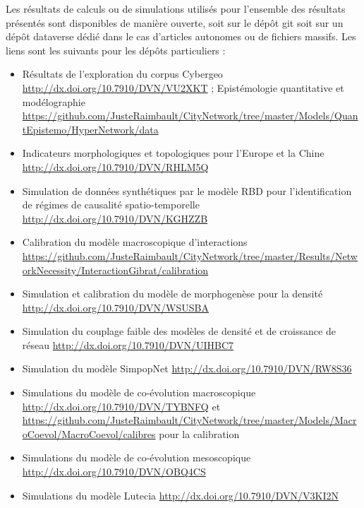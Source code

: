 Les résultats de calculs ou de simulations utilisés pour l'ensemble des résultats présentés sont disponibles de manière ouverte, soit sur le dépôt git soit sur un dépôt dataverse dédié dans le cas d'articles autonomes ou de fichiers massifs. Les liens sont les suivants pour les dépôts particuliers :

\begin{itemize}
	\item Résultats de l'exploration du corpus Cybergeo \url{http://dx.doi.org/10.7910/DVN/VU2XKT} ; Epistémologie quantitative et modélographie \url{https://github.com/JusteRaimbault/CityNetwork/tree/master/Models/QuantEpistemo/HyperNetwork/data}
	\item Indicateurs morphologiques et topologiques pour l'Europe et la Chine \url{http://dx.doi.org/10.7910/DVN/RHLM5Q}
	\item Simulation de données synthétiques par le modèle RBD pour l'identification de régimes de causalité spatio-temporelle \url{http://dx.doi.org/10.7910/DVN/KGHZZB}
	\item Calibration du modèle macroscopique d'interactions \url{https://github.com/JusteRaimbault/CityNetwork/tree/master/Results/NetworkNecessity/InteractionGibrat/calibration}
	\item Simulation et calibration du modèle de morphogenèse pour la densité \url{http://dx.doi.org/10.7910/DVN/WSUSBA}
	\item Simulation du couplage faible des modèles de densité et de croissance de réseau \url{http://dx.doi.org/10.7910/DVN/UIHBC7}
	\item Simulation du modèle SimpopNet \url{http://dx.doi.org/10.7910/DVN/RW8S36}
	\item Simulations du modèle de co-évolution macroscopique \url{http://dx.doi.org/10.7910/DVN/TYBNFQ} et \url{https://github.com/JusteRaimbault/CityNetwork/tree/master/Models/MacroCoevol/MacroCoevol/calibres} pour la calibration
	\item Simulations du modèle de co-évolution mesoscopique \url{http://dx.doi.org/10.7910/DVN/OBQ4CS}
	\item Simulations du modèle Lutecia \url{http://dx.doi.org/10.7910/DVN/V3KI2N}
\end{itemize}




\stars









